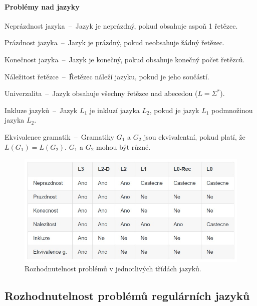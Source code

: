 \paragraph*{Problémy nad jazyky} \begin{compactitem}
    \item Neprázdnost jazyka~--~Jazyk je neprázdný, pokud obsahuje aspoň 1 řetězec.

    \item Prázdnost jazyka~--~Jazyk je prázdný, pokud neobsahuje žádný řetězec.

    \item Konečnost jazyka~--~Jazyk je konečný, pokud obsahuje konečný počet řetězců.

    \item Náležitost řetězce~--~Řetězec náleží jazyku, pokud je jeho součástí.

    \item Univerzalita~--~Jazyk obsahuje všechny řetězce nad abecedou ($L = \Sigma^* $).

    \item Inkluze jazyků~--~Jazyk $L_1$ je inkluzí jazyka $L_2$, pokud je jazyk $L_1$ podmnožinou jazyka $L_2$.

    \item Ekvivalence gramatik~--~Gramatiky $G_1$ a $G_2$ jsou ekvivalentní, pokud platí, že\break $L(G_1) = L(G_2)$. $G_1$ a $G_2$ mohou být různé.
\end{compactitem}

\begin{figure}[H]
    \centering
    \includegraphics[width=1\linewidth]{rozhodnutelnost_jazyku.png}
    \caption{Rozhodnutelnost problémů v jednotlivých třídách jazyků.}
\end{figure}

\subsection{Rozhodnutelnost problémů regulárních jazyků}

